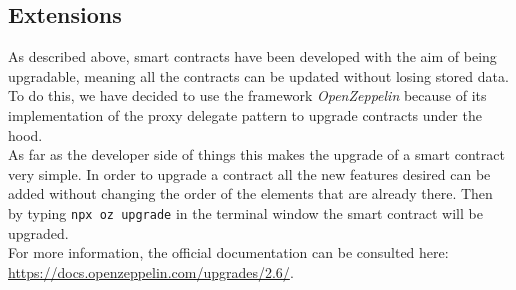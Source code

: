 \subsection{Extensions}  %
As described above, smart contracts have been developed with the aim of being upgradable, meaning all the contracts can be updated without losing stored data. \\
To do this, we have decided to use the framework \textit{OpenZeppelin} because of its implementation of the proxy delegate pattern to upgrade contracts under the hood. \\
As far as the developer side of things this makes the upgrade of a smart contract very simple. In order to upgrade a contract all the new features desired can be added without changing the order of the elements that are already there. Then by typing \texttt{npx oz upgrade} in the terminal window the smart contract will be upgraded. \\
For more information, the official documentation can be consulted here: \url{https://docs.openzeppelin.com/upgrades/2.6/}.